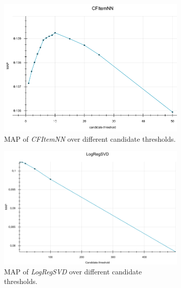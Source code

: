 \documentclass[10pt]{reportMaster}
\begin{document}
\begin{figure}
	\begin{subfigure}[c]{0.5\textwidth}
		\centering
		\includegraphics[width=1\textwidth]{figures/experiments/CFItemNNCandidates}
		\caption{MAP of \textit{CFItemNN} over different candidate thresholds.}
		\label{fig:CFItemNNCandidates}
	\end{subfigure}
	\begin{subfigure}[c]{0.5\textwidth}
		\centering
		\includegraphics[width=1\textwidth]{figures/experiments/LogRegSVDCandidates}
		\caption{MAP of \textit{LogRegSVD} over different candidate thresholds.}
		\label{fig:LogRegSVDCandidates}
	\end{subfigure}
	\begin{subfigure}[c]{0.5\textwidth}
		\centering

\end{subfigure}
\end{figure}
\end{document}
